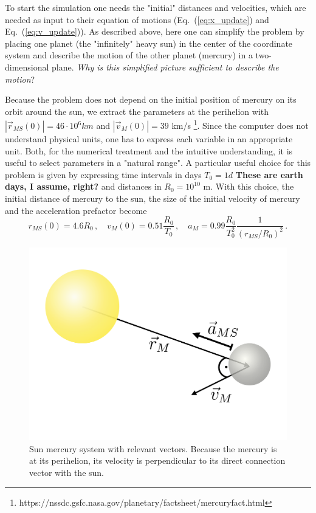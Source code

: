 \documentclass[12pt]{iopart}
\newcommand{\abs}[1]{\left\vert #1 \right\vert}
\begin{document}
To start the simulation one needs the "initial" distances and velocities, which are needed as input to their equation of motions (Eq.~(\ref{eq:x_update}) and Eq.~(\ref{eq:v_update})).  As described above, here  one can simplify the problem by placing one planet (the "infinitely" heavy sun) in the center of the coordinate system and describe the motion of the other planet (mercury) in a two-dimensional plane.  \textit{Why is this simplified picture sufficient to describe the motion}?

Because the problem does not depend on the initial position of mercury on its orbit around the sun, we extract the parameters at the perihelion with $ \abs{\vec r_{MS}(0)} = 46 \cdot 10^6 km$ and $ \abs{\vec v_M(0)} = 39$ km/s \footnote{https://nssdc.gsfc.nasa.gov/planetary/factsheet/mercuryfact.html}.  Since the computer does not understand physical units, one has to express each variable in an appropriate unit.  Both, for the numerical treatment and the intuitive understanding, it is useful to select parameters in a "natural range".  A particular useful choice for this problem is given by expressing time intervals in days $T_0 = 1d$ {\bf These are earth days, I assume, right?} and distances in $R_0 = 10^{10}$ m.  With this choice, the initial distance of mercury to the sun, the size of the initial velocity of mercury and the acceleration prefactor become
\begin{equation}
	r_{MS}(0) = 4.6 R_0 \, , \quad
	v_{M}(0)  = 0.51 \frac{R_0}{T_0} \, ,  \quad
	a_M       = 0.99 \frac{R_0}{T_0^2} \frac{1}{\left(r_{MS}/R_0\right)^2}
	\, .
\end{equation}

\begin{figure}[htb]
	\centering
	\includegraphics[width=.4\textwidth]{figs/sun_merc.pdf}
	\caption{\label{fig:sun_merc}Sun mercury system with relevant vectors.  Because the mercury is at its perihelion, its velocity is perpendicular to its direct connection vector with the sun.}
\end{figure}
\end{document}
